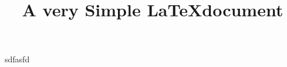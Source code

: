 \documentclass{article}
\begin{document}
\title{A very Simple \LaTeX document}
\date{}
\maketitle

sdfasfd
\end{document}
